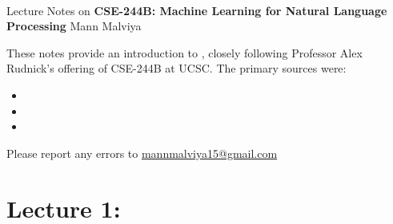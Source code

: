 \documentclass[11pt]{article}
\begin{document}
\thispagestyle{empty}
\bigskip \
\vspace{0.1cm}

\begin{center}
{\fontsize{22}{22} \selectfont Lecture Notes on}
\vskip 16pt
{\fontsize{20}{20} \selectfont \bf \sffamily CSE-244B: Machine Learning for Natural Language Processing}
\vskip 24pt
{\fontsize{18}{18} \selectfont \rmfamily Mann Malviya}
\vskip 6pt
{\fontsize{14}{14} \selectfont {}}
\vskip 24pt
\end{center}

{\parindent0pt \baselineskip=15.5pt These notes provide an introduction to , closely following Professor Alex Rudnick's offering of CSE-244B at UCSC. The primary sources were:

\begin{itemize}
    \item
    \item
    \item
\end{itemize}

Please report any errors to \href{mailto:mannmalviya15@gmail.com}{mannmalviya15@gmail.com}


}

\newpage
\tableofcontents
\newpage

\section*{Lecture 1:}
\end{document}
